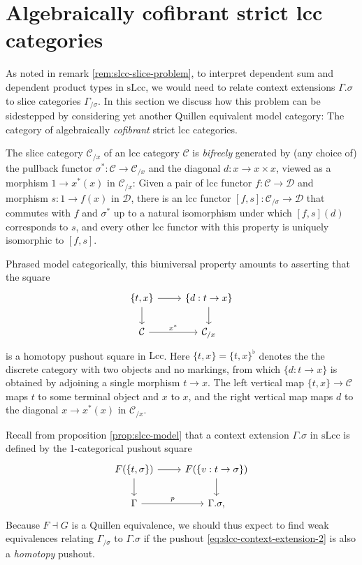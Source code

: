 \documentclass[a4paper]{article}
\theoremstyle{remark}
\theoremstyle{definition}
\begin{document}
\section{Algebraically cofibrant strict lcc categories}
\label{sec:algebraically-cofibrant}

As noted in remark \ref{rem:slcc-slice-problem}, to interpret dependent sum and dependent product types in $\mathrm{sLcc}$, we would need to relate context extensions $\Gamma.\sigma$ to slice categories $\Gamma_{/ \sigma}$.
In this section we discuss how this problem can be sidestepped by considering yet another Quillen equivalent model category: The category of algebraically \emph{cofibrant} strict lcc categories.

The slice category $\mathcal{C}_{/ x}$ of an lcc category $\mathcal{C}$ is \emph{bifreely} generated by (any choice of) the pullback functor $\sigma^* : \mathcal{C} \rightarrow \mathcal{C}_{/ x}$ and the diagonal $d : x \rightarrow x \times x$, viewed as a morphism $1 \rightarrow x^*(x)$ in $\mathcal{C}_{/ x}$:
Given a pair of lcc functor $f : \mathcal{C} \rightarrow \mathcal{D}$ and morphism $s : 1 \rightarrow f(x)$ in $\mathcal{D}$, there is an lcc functor $[f, s] : \mathcal{C}_{/ \sigma} \rightarrow \mathcal{D}$ that commutes with $f$ and $\sigma^*$ up to a natural isomorphism under which $[f, s](d)$ corresponds to $s$, and every other lcc functor with this property is uniquely isomorphic to $[f, s]$.

Phrased model categorically, this biuniversal property amounts to asserting that the square
\begin{equation}
  \label{eq:homotopy-pushout-lcc}
  \begin{tikzcd}
    \{ t, x \} \arrow[r] \arrow[d] & \{ d : t \rightarrow x \} \arrow[d] \\
    \mathcal{C} \arrow[r, "x^*"] & \mathcal{C}_{/ x}
  \end{tikzcd}
\end{equation}
is a homotopy pushout square in $\mathrm{Lcc}$.
Here $\{t, x\} = \{t, x\}^\flat$ denotes the the discrete category with two objects and no markings, from which $\{d : t \rightarrow x\}$ is obtained by adjoining a single morphism $t \rightarrow x$.
The left vertical map $\{ t, x \} \rightarrow \mathcal{C}$ maps $t$ to some terminal object and $x$ to $x$, and the right vertical map maps $d$ to the diagonal $x \rightarrow x^*(x)$ in $\mathcal{C}_{/ x}$.

Recall from proposition \ref{prop:slcc-model} that a context extension $\Gamma.\sigma$ in $\mathrm{sLcc}$ is defined by the 1-categorical pushout square
\begin{equation}
  \label{eq:slcc-context-extension-2}
  \begin{tikzcd}
    F(\{ t, \sigma \}) \arrow[d] \arrow[r] & F(\{ v : t \rightarrow \sigma \}) \arrow[d] \\
    \Gamma \arrow[r, "p"] & \Gamma.\sigma,
  \end{tikzcd}
\end{equation}
Because $F \dashv G$ is a Quillen equivalence, we should thus expect to find weak equivalences relating $\Gamma_{/ \sigma}$ to $\Gamma.\sigma$ if the pushout \eqref{eq:slcc-context-extension-2} is also a \emph{homotopy} pushout.
\end{document}
